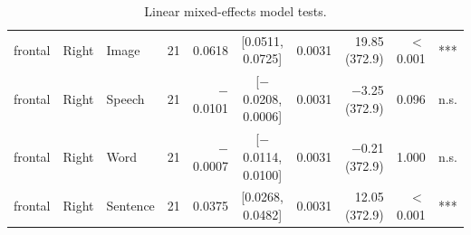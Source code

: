 \begin{table}[h]
\begin{tabular}{lllrrcrrrl}
frontal & Right & Image & 21 & 0.0618 & [0.0511, 0.0725] & 0.0031 & 19.85 (372.9) & $<$0.001 & *** \\
frontal & Right & Speech & 21 & $-$0.0101 & [$-$0.0208, 0.0006] & 0.0031 & $-$3.25 (372.9) & 0.096 & n.s. \\
frontal & Right & Word & 21 & $-$0.0007 & [$-$0.0114, 0.0100] & 0.0031 & $-$0.21 (372.9) & 1.000 & n.s. \\
frontal & Right & Sentence & 21 & 0.0375 & [0.0268, 0.0482] & 0.0031 & 12.05 (372.9) & $<$0.001 & *** \\
\bottomrule
\end{tabular}
\caption{Linear mixed-effects model tests.}
\end{table}
